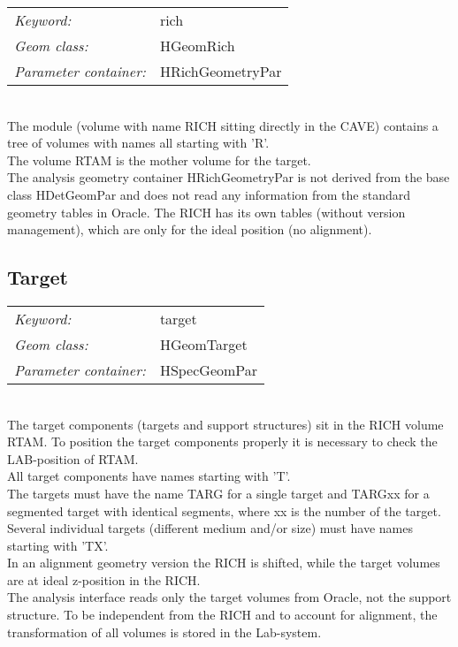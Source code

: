 \begin{tabular}{ll}
\emph{Keyword:}             & rich \\
\emph{Geom class:}          & HGeomRich \\
\emph{Parameter container:} & HRichGeometryPar 
\end{tabular}\\

The module (volume with name RICH sitting directly in the CAVE) contains a tree of volumes with names all starting with 'R'.\\
The volume RTAM is the mother volume for the target.\\

The analysis geometry container HRichGeometryPar is not derived from the base class HDetGeomPar and does not read any 
information from the standard geometry tables in Oracle. The RICH has its own tables (without version management), which 
are only for the ideal position (no alignment).

\subsection*{Target}

\begin{tabular}{ll}
\emph{Keyword:}             & target \\
\emph{Geom class:}          & HGeomTarget \\
\emph{Parameter container:} & HSpecGeomPar 
\end{tabular}\\

The target components (targets and support structures) sit in the RICH volume RTAM. To position the target components properly 
it is necessary to check the LAB-position of RTAM.\\
All target components have names starting with 'T'.\\
The targets must have the name TARG for a single target and TARGxx for a segmented target with identical segments, where xx 
is the number of the target. Several individual targets (different medium and/or size) must have names starting with 'TX'.\\
In an alignment geometry version the RICH is shifted, while the target volumes are at ideal z-position in the RICH.\\

The analysis interface reads only the target volumes from Oracle, not the support structure. To be independent from the RICH 
and to account for alignment, the transformation of all volumes is stored in the Lab-system.

